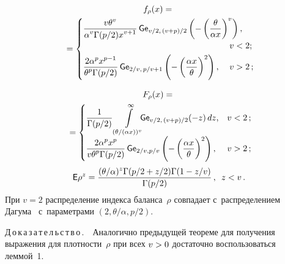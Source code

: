 \begin{multicols}{2}
\noindent
\begin{multline*}%
f_\rho(x) ={}\\
{}=
 \begin{cases}
   \displaystyle \fr{v\theta^{v}}{\alpha^{v}\Gamma(p/2)x^{v+1}}\,{\sf Ge}_{v/2,\, 
(v+p)/2}\left(-\left(\fr{\theta}{\alpha x}\right)^{v}\right), & \\
&\hspace*{-25pt}v<2;\hspace*{-0.96239pt}\\[3pt]
  \displaystyle \fr{2\alpha^{p}x^{p-1}}{\theta^{p}\Gamma(p/2)}\,{\sf Ge}_{2/v,\, 
p/v+1}\left(-\left(\fr{\alpha x}{\theta}\right)^2\right), &\hspace*{-25pt}v>2\,;\hspace*{-0.96239pt}\\
 \end{cases}
\end{multline*}

\vspace*{-12pt}

\noindent
\begin{multline*}
F_\rho(x) ={}\\
{}=
 \begin{cases}
   \displaystyle \displaystyle\frac{\displaystyle 1 \mathstrut}{\displaystyle \Gamma(p/2)\mathstrut}\int\limits_{(\theta/(\alpha 
x))^{v}}^\infty \hspace*{-6pt}{\sf Ge}_{v/2,\,(v+p)/2}(-z) \, dz, &v<2\,;\hspace*{-1.62056pt}\\[6pt]
   \displaystyle \displaystyle\frac{\displaystyle 2\alpha^{p} 
x^{p}\mathstrut}{\displaystyle v\theta^{p}\Gamma(p/2)\mathstrut}\,{\sf Ge}_{2/v,p/v}\left(-\left(\displaystyle\frac{\displaystyle \alpha 
x\mathstrut}{\displaystyle \theta\mathstrut}\right)^2\right), &v>2\,;\hspace*{-1.62056pt}
 \end{cases}
\end{multline*}
$$
{\sf E}\rho^z =\displaystyle\frac{\displaystyle (\theta/\alpha)^{z} \Gamma(p/2+z/2)\Gamma(1-
z/v)\mathstrut}{\displaystyle \Gamma(p/2)\mathstrut}\,, \enskip z<v\,.
$$
При $v=2$ распределение индекса баланса~$\rho$ совпадает с~распределением 
Дагума~\cite{Dagum1977} с~параметрами $(2,\theta/\alpha,p/2)$.


\smallskip

\noindent
Д\,о\,к\,а\,з\,а\,т\,е\,л\,ь\,с\,т\,в\,о\,.\ \
 Аналогично предыдущей тео\-ре\-ме для получения 
выражения для плотности~$\rho$ при всех $v\hm>0$ достаточно воспользоваться 
леммой~1.


\end{multicols}
